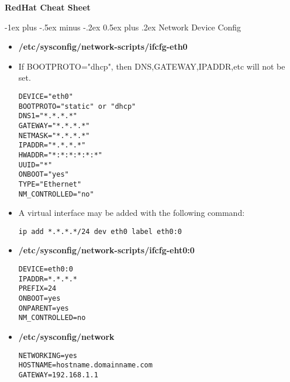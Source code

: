\documentclass[10pt,landscape]{article}
\makeatletter
\renewcommand{\section}{\@startsection{section}{1}{0mm}%
                                {-1ex plus -.5ex minus -.2ex}%
                                {0.5ex plus .2ex}%
                                {\normalfont\large\bfseries}}
\makeatother
\begin{document}
\raggedright
\footnotesize
\begin{multicols}{3}


\setlength{\premulticols}{1pt}
\setlength{\postmulticols}{1pt}
\setlength{\multicolsep}{1pt}
\setlength{\columnsep}{2pt}

\begin{center}
     \Large{\textbf{RedHat Cheat Sheet}} \\
\end{center}

\section{Network Device Config}
\begin{itemize}
\item \textbf{/etc/sysconfig/network-scripts/ifcfg-eth0}
\item If BOOTPROTO="dhcp", then DNS,GATEWAY,IPADDR,etc will not be set.
\begin{verbatim}
DEVICE="eth0" 
BOOTPROTO="static" or "dhcp" 
DNS1="*.*.*.*" 
GATEWAY="*.*.*.*" 
NETMASK="*.*.*.*"
IPADDR="*.*.*.*" 
HWADDR="*:*:*:*:*:*"
UUID="*"
ONBOOT="yes" 
TYPE="Ethernet" 
NM_CONTROLLED="no"
\end{verbatim}


\item A virtual interface may be added with the following command:
\begin{verbatim}
ip add *.*.*.*/24 dev eth0 label eth0:0
\end{verbatim}

\item \textbf{/etc/sysconfig/network-scripts/ifcfg-eht0:0}
\begin{verbatim}
DEVICE=eth0:0
IPADDR=*.*.*.*
PREFIX=24
ONBOOT=yes
ONPARENT=yes
NM_CONTROLLED=no
\end{verbatim}
\item \textbf{/etc/sysconfig/network}
\begin{verbatim}
NETWORKING=yes 
HOSTNAME=hostname.domainname.com 
GATEWAY=192.168.1.1
\end{verbatim}
\end{itemize}

\end{multicols}
\end{document}
